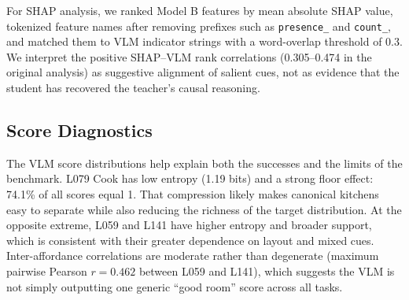 \documentclass[10pt,twocolumn]{article}
\begin{document}
\begin{table}[t]
\centering
\scriptsize
\caption{Final LightGBM hyperparameters used to retrain the reported tabular
models on train+validation rows.}
\label{tab:hparams}
\end{table}

For SHAP analysis, we ranked Model B features by mean absolute SHAP value,
tokenized feature names after removing prefixes such as \texttt{presence\_} and
\texttt{count\_}, and matched them to VLM indicator strings with a word-overlap
threshold of 0.3. We interpret the positive SHAP--VLM rank correlations
(0.305--0.474 in the original analysis) as suggestive alignment of salient
cues, not as evidence that the student has recovered the teacher's causal
reasoning.

\subsection{Score Diagnostics}

The VLM score distributions help explain both the successes and the limits of
the benchmark. L079 Cook has low entropy (1.19 bits) and a strong floor effect:
74.1\% of all scores equal 1. That compression likely makes canonical kitchens
easy to separate while also reducing the richness of the target distribution.
At the opposite extreme, L059 and L141 have higher entropy and broader support,
which is consistent with their greater dependence on layout and mixed cues.
Inter-affordance correlations are moderate rather than degenerate (maximum
pairwise Pearson $r=0.462$ between L059 and L141), which suggests the VLM is
not simply outputting one generic ``good room'' score across all tasks.
\end{document}
